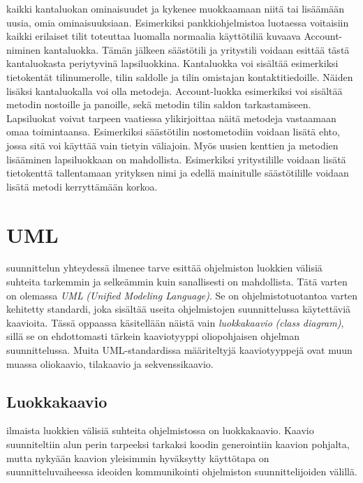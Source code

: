 \documentclass[a4paper,justified,notoc]{tufte-book}
\newcommand{\eng}[1]{\textit{(#1)}}
\newcommand{\new}[1]{\textit{\gls{#1}}}
\newcommand{\neweng}[2]{\new{#1} \eng{#2}}
\begin{document}
\begin{fullwidth}
 kaikki kantaluokan ominaisuudet ja kykenee muokkaamaan niitä tai
lisäämään uusia, omia ominaisuuksiaan. Esimerkiksi pankkiohjelmistoa luotaessa voitaisiin kaikki
erilaiset tilit toteuttaa luomalla normaalia käyttötiliä kuvaava Account-niminen kantaluokka.
Tämän jälkeen säästötili ja yritystili voidaan esittää tästä kantaluokasta periytyvinä
lapsiluokkina. Kantaluokka voi sisältää esimerkiksi tietokentät tilinumerolle, tilin saldolle ja
tilin omistajan kontaktitiedoille. Näiden lisäksi kantaluokalla voi olla metodeja. Account-luokka
esimerkiksi voi sisältää metodin nostoille ja panoille, sekä metodin tilin saldon tarkastamiseen.
Lapsiluokat voivat tarpeen vaatiessa ylikirjoittaa näitä metodeja vastaamaan omaa toimintaansa.
Esimerkiksi säästötilin nostometodiin voidaan lisätä ehto, jossa sitä voi käyttää vain tietyin
väliajoin. Myös uusien kenttien ja metodien lisääminen lapsiluokkaan on mahdollista. Esimerkiksi
yritystilille voidaan lisätä tietokenttä tallentamaan yrityksen nimi ja edellä mainitulle
säästötilille voidaan lisätä metodi kerryttämään korkoa.


\section{UML}
\label{paskaa}

 suunnittelun yhteydessä ilmenee tarve esittää ohjelmiston
luokkien välisiä suhteita tarkemmin ja selkeämmin kuin sanallisesti on mahdollista. Tätä varten on
olemassa \neweng{UML}{Unified Modeling Language}. Se on ohjelmistotuotantoa varten kehitetty
standardi, joka sisältää useita ohjelmistojen suunnittelussa käytettäviä kaavioita. Tässä oppaassa
käsitellään näistä vain \neweng{luokkakaavio}{class diagram}, sillä se on ehdottomasti tärkein
kaaviotyyppi oliopohjaisen ohjelman suunnittelussa. Muita UML-standardissa määriteltyjä
kaaviotyyppejä ovat muun muassa oliokaavio, tilakaavio ja sekvenssikaavio.

\subsection{Luokkakaavio}
\label{luokkakaavio}

 ilmaista luokkien välisiä suhteita ohjelmistossa on
\gls{luokkakaavio}. Kaavio suunniteltiin alun perin tarpeeksi tarkaksi koodin generointiin kaavion
pohjalta, mutta nykyään kaavion yleisimmin hyväksytty käyttötapa on suunnitteluvaiheessa ideoiden
kommunikointi ohjelmiston suunnittelijoiden välillä.


\end{fullwidth}
\end{document}
